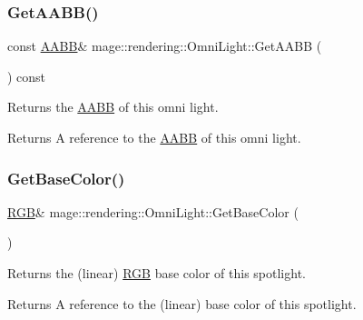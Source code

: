 \subsubsection{\texorpdfstring{Get\+A\+A\+B\+B()}{GetAABB()}}
{\footnotesize\ttfamily const \mbox{\hyperlink{classmage_1_1_a_a_b_b}{A\+A\+BB}}\& mage\+::rendering\+::\+Omni\+Light\+::\+Get\+A\+A\+BB (\begin{DoxyParamCaption}{ }\end{DoxyParamCaption}) const\hspace{0.3cm}{\ttfamily [noexcept]}}

Returns the \mbox{\hyperlink{classmage_1_1_a_a_b_b}{A\+A\+BB}} of this omni light.

\begin{DoxyReturn}{Returns}
A reference to the \mbox{\hyperlink{classmage_1_1_a_a_b_b}{A\+A\+BB}} of this omni light. 
\end{DoxyReturn}
\mbox{\label{classmage_1_1rendering_1_1_omni_light_a408bde4df7fd40750cb0e4dd4d2f6d1a}} 
\subsubsection{\texorpdfstring{Get\+Base\+Color()}{GetBaseColor()}\hspace{0.1cm}{\footnotesize\ttfamily [1/2]}}
{\footnotesize\ttfamily \mbox{\hyperlink{structmage_1_1_r_g_b}{R\+GB}}\& mage\+::rendering\+::\+Omni\+Light\+::\+Get\+Base\+Color (\begin{DoxyParamCaption}{ }\end{DoxyParamCaption})\hspace{0.3cm}{\ttfamily [noexcept]}}

Returns the (linear) \mbox{\hyperlink{structmage_1_1_r_g_b}{R\+GB}} base color of this spotlight.

\begin{DoxyReturn}{Returns}
A reference to the (linear) base color of this spotlight. 
\end{DoxyReturn}
\mbox{\label{classmage_1_1rendering_1_1_omni_light_a6c68ed32167890c1b0f01130c610c3e2}} 
